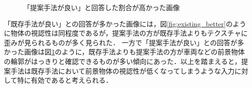 \documentclass[11pt,dvipdfmx]{ujreport}
\begin{document}
\begin{figure}[tb]
    \centering
    \caption{「提案手法が良い」と回答した割合が高かった画像}
    \label{fig:proposed_better}
\end{figure}

「既存手法が良い」との回答が多かった画像には，図\ref{fig:existing_better}のように物体の視認性は同程度であるが，提案手法の方が既存手法よりもテクスチャに歪みが見られるものが多く見られた．
一方で「提案手法が良い」との回答が多かった画像は図\ref{fig:proposed_better}のように，既存手法よりも提案手法の方が車両などの前景物体の輪郭がはっきりと確認できるものが多い傾向にあった．以上を踏まえると，提案手法は既存手法において前景物体の視認性が低くなってしまうような入力に対して特に有効であると考えられる．
\end{document}
